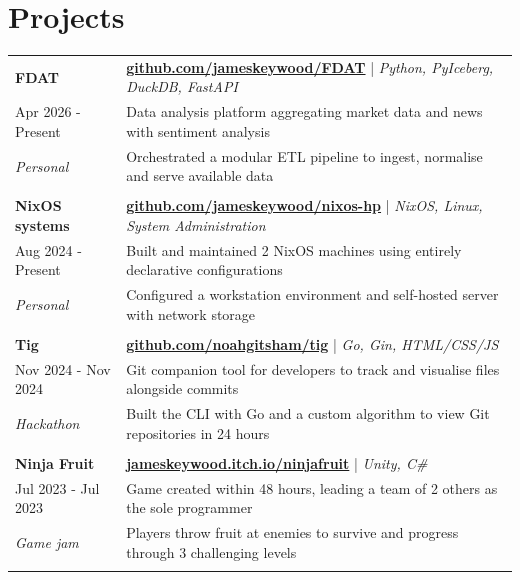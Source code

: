 \documentclass[a4paper, 11pt]{article}
\begin{document}
\section{Projects}
\begin{tabular}{ l p{15in} }
	\textbf{FDAT} & \href{https://github.com/jameskeywood/FDAT}{\textbf{github.com/jameskeywood/FDAT}} | \textit{Python, PyIceberg, DuckDB, FastAPI}\\
    Apr 2026 - Present & Data analysis platform aggregating market data and news with sentiment analysis\\
    \textit{Personal} & Orchestrated a modular ETL pipeline to ingest, normalise and serve available data\\\\
	\textbf{NixOS systems} & \href{https://github.com/jameskeywood/nixos-hp}{\textbf{github.com/jameskeywood/nixos-hp}} | \textit{NixOS, Linux, System Administration}\\
    Aug 2024 - Present &  Built and maintained 2 NixOS machines using entirely declarative configurations\\
    \textit{Personal} & Configured a workstation environment and self-hosted server with network storage\\\\
    \textbf{Tig} & \href{https://github.com/noahgitsham/tig}{\textbf{github.com/noahgitsham/tig}} | \textit{Go, Gin, HTML/CSS/JS}\\
    Nov 2024 - Nov 2024 & Git companion tool for developers to track and visualise files alongside commits\\
    \textit{Hackathon} & Built the CLI with Go and a custom algorithm to view Git repositories in 24 hours\\\\
    \textbf{Ninja Fruit} & \href{https://jameskeywood.itch.io/ninjafruit}{\textbf{jameskeywood.itch.io/ninjafruit}} | \textit{Unity, C\#}\\
    Jul 2023 - Jul 2023 & Game created within 48 hours, leading a team of 2 others as the sole programmer\\
    \textit{Game jam} & Players throw fruit at enemies to survive and progress through 3 challenging levels\\\\
\end{tabular}
\end{document}
